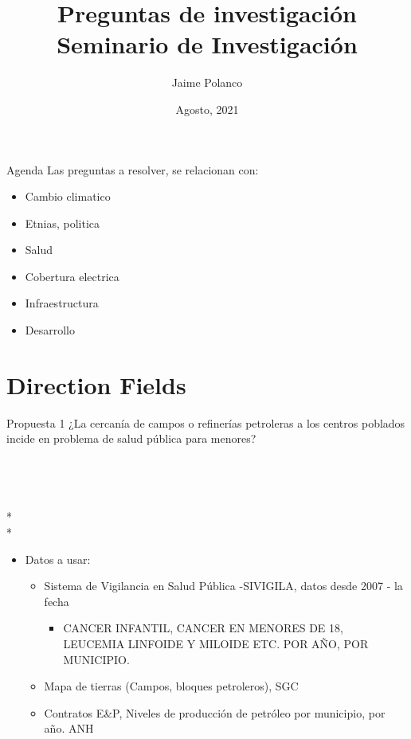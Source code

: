 \documentclass[9pt]{beamer}
\title[PROPUESTA]{Preguntas de investigación\\ Seminario de Investigación}
\author[Jaime Polanco] { Jaime Polanco\inst{1}}
\institute[PUJ] %
{
  \inst{1}%
  Facultad de Ciencias Económicas y Administrativas\\
  Pontificia Universidad Javeriana

}
\date{Agosto, 2021}
\begin{document}

\begin{frame}
\titlepage
\end{frame}



\begin{frame}{Agenda}
Las preguntas a resolver, se relacionan con:
\begin{itemize}
\item Cambio climatico
\item Etnias, politica  
\item Salud
\item Cobertura electrica
\item Infraestructura
\item Desarrollo

\end{itemize}
\end{frame}

\section{Direction Fields}
 
 
\begin{frame}{Propuesta 1}
¿La cercanía de campos o refinerías petroleras a los centros poblados incide en problema de salud pública para menores?\\~\\
\\~\\
\\*
\\*
\begin{itemize}
\item [] Datos a usar:
\begin{itemize}
\item Sistema de Vigilancia en Salud Pública -SIVIGILA, datos desde 2007 - la fecha
    \begin{itemize}
    \item CANCER INFANTIL, CANCER EN MENORES DE 18, LEUCEMIA LINFOIDE Y MILOIDE ETC. POR AÑO, POR MUNICIPIO.
\end{itemize}
\item Mapa de tierras (Campos, bloques petroleros), SGC
\item Contratos E\&P, Niveles de producción de petróleo por municipio, por año. ANH

\end{itemize}
\end{itemize}

\end{frame}
\end{document}
